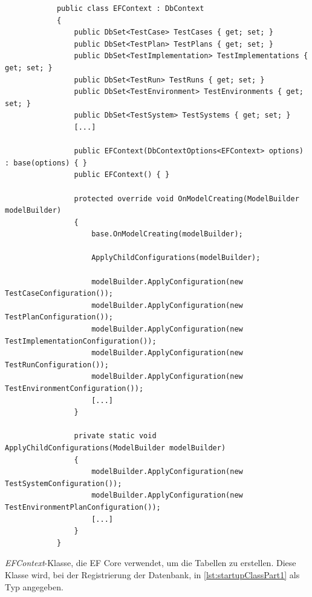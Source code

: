 \documentclass[a4paper, fontsize=11pt, parskip=half, twoside]{scrreprt}
\begin{document}
	\begin{listing}[ht]
		\begin{verbatim}
			public class EFContext : DbContext
			{
				public DbSet<TestCase> TestCases { get; set; }
				public DbSet<TestPlan> TestPlans { get; set; }
				public DbSet<TestImplementation> TestImplementations { get; set; }
				public DbSet<TestRun> TestRuns { get; set; }
				public DbSet<TestEnvironment> TestEnvironments { get; set; }		
				public DbSet<TestSystem> TestSystems { get; set; }
				[...]
				
				public EFContext(DbContextOptions<EFContext> options) : base(options) { }	
				public EFContext() { }
				
				protected override void OnModelCreating(ModelBuilder modelBuilder)
				{
					base.OnModelCreating(modelBuilder);
					
					ApplyChildConfigurations(modelBuilder);
					
					modelBuilder.ApplyConfiguration(new TestCaseConfiguration());
					modelBuilder.ApplyConfiguration(new TestPlanConfiguration());
					modelBuilder.ApplyConfiguration(new TestImplementationConfiguration());
					modelBuilder.ApplyConfiguration(new TestRunConfiguration());
					modelBuilder.ApplyConfiguration(new TestEnvironmentConfiguration());
					[...]
				}
				
				private static void ApplyChildConfigurations(ModelBuilder modelBuilder)
				{
					modelBuilder.ApplyConfiguration(new TestSystemConfiguration());
					modelBuilder.ApplyConfiguration(new TestEnvironmentPlanConfiguration());
					[...]
				}
			}
		\end{verbatim}
		\caption{
			\emph{EFContext}-Klasse, die \ac{EF} Core verwendet, um die Tabellen zu erstellen. 
			Diese Klasse wird, bei der Registrierung der Datenbank, in \autoref{lst:startupClassPart1} als Typ angegeben.
		}
		\label{lst:efcontextClass}
	\end{listing}
\end{document}
